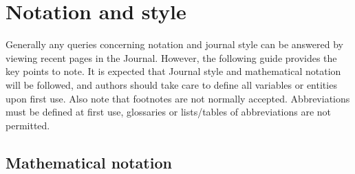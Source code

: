 \documentclass[lineno]{jfm}
\begin{document}
\section{Notation and style}\label{notstyle}
 Generally any queries concerning notation and journal style can be answered by viewing recent pages in the Journal. However, the following guide provides the key points to note. It is expected that Journal style and mathematical notation will be followed, and authors should take care to define all variables or entities upon first use. Also note that footnotes are not normally accepted.  Abbreviations must be defined at first use, glossaries or lists/tables of abbreviations are not permitted.

\subsection{Mathematical notation}
\end{document}
